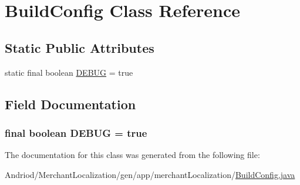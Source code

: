 \hypertarget{classapp_1_1merchant_localization_1_1_build_config}{\section{Build\-Config Class Reference}
\label{classapp_1_1merchant_localization_1_1_build_config}
}
\subsection*{Static Public Attributes}
\begin{DoxyCompactItemize}
\item 
static final boolean \hyperlink{classapp_1_1merchant_localization_1_1_build_config_a8270736aa6257cdc33f11a875840a05e}{D\-E\-B\-U\-G} = true
\end{DoxyCompactItemize}


\subsection{Field Documentation}
\hypertarget{classapp_1_1merchant_localization_1_1_build_config_a8270736aa6257cdc33f11a875840a05e}{
\subsubsection[{D\-E\-B\-U\-G}]{\setlength{\rightskip}{0pt plus 5cm}final boolean D\-E\-B\-U\-G = true\hspace{0.3cm}{\ttfamily [static]}}}\label{classapp_1_1merchant_localization_1_1_build_config_a8270736aa6257cdc33f11a875840a05e}


The documentation for this class was generated from the following file\-:\begin{DoxyCompactItemize}
\item 
Andriod/\-Merchant\-Localization/gen/app/merchant\-Localization/\hyperlink{_merchant_localization_2gen_2app_2merchant_localization_2_build_config_8java}{Build\-Config.\-java}\end{DoxyCompactItemize}
